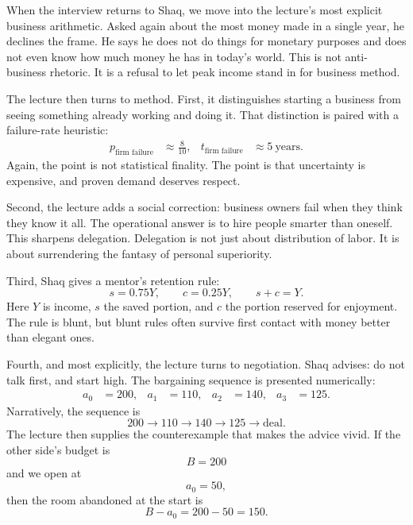 When the interview returns to Shaq, we move into the lecture's most explicit business arithmetic. Asked again about the most money made in a single year, he declines the frame. He says he does not do things for monetary purposes and does not even know how much money he has in today's world. This is not anti-business rhetoric. It is a refusal to let peak income stand in for business method.

The lecture then turns to method. First, it distinguishes starting a business from seeing something already working and doing it. That distinction is paired with a failure-rate heuristic:
\begin{align}
p_{\text{firm failure}} &\approx \frac{8}{10}, &
t_{\text{firm failure}} &\approx 5\ \text{years}.
\end{align}
Again, the point is not statistical finality. The point is that uncertainty is expensive, and proven demand deserves respect.

Second, the lecture adds a social correction: business owners fail when they think they know it all. The operational answer is to hire people smarter than oneself. This sharpens delegation. Delegation is not just about distribution of labor. It is about surrendering the fantasy of personal superiority.

Third, Shaq gives a mentor's retention rule:
\begin{equation}
s = 0.75Y,\qquad c = 0.25Y,\qquad s+c=Y.
\end{equation}
Here \(Y\) is income, \(s\) the saved portion, and \(c\) the portion reserved for enjoyment. The rule is blunt, but blunt rules often survive first contact with money better than elegant ones.

Fourth, and most explicitly, the lecture turns to negotiation. Shaq advises: do not talk first, and start high. The bargaining sequence is presented numerically:
\begin{align}
a_0 &= 200, &
a_1 &= 110, &
a_2 &= 140, &
a_3 &= 125.
\end{align}
Narratively, the sequence is
\begin{equation}
200 \to 110 \to 140 \to 125 \to \text{deal}.
\end{equation}
The lecture then supplies the counterexample that makes the advice vivid. If the other side's budget is
\begin{equation}
B = 200
\end{equation}
and we open at
\begin{equation}
a_0 = 50,
\end{equation}
then the room abandoned at the start is
\begin{equation}
B-a_0 = 200-50 = 150.
\end{equation}

